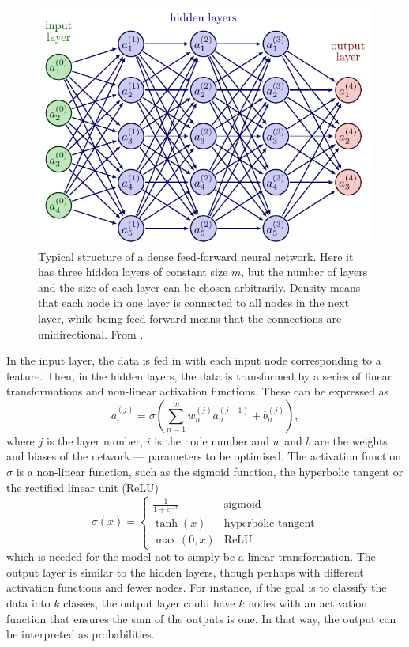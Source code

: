 \begin{figure}
    \centering
    \includegraphics[width=0.8\linewidth, page=4]{tex/02_ml/neural_networks.pdf}
    \caption{
        Typical structure of a dense feed-forward neural network.
        Here it has three hidden layers of constant size $m$, but the number of layers and the size of each layer can be chosen arbitrarily.
        Density means that each node in one layer is connected to all nodes in the next layer, while being feed-forward means that the connections are unidirectional.
        From \cite{nn_figs}.
    }
    \label{fig:nn}
\end{figure}

In the input layer, the data is fed in with each input node corresponding to a feature.
Then, in the hidden layers, the data is transformed by a series of linear transformations and non-linear activation functions.
These can be expressed as
\begin{equation}
    \label{eq:nn}
    a_i^{(j)} = \sigma\left( \sum_{n=1}^m w^{(j)}_n a^{(j-1)}_n + b^{(j)}_n \right),
\end{equation}
where $j$ is the layer number, $i$ is the node number and $w$ and $b$ are the weights and biases of the network — parameters to be optimised.
The activation function $\sigma$ is a non-linear function, such as the sigmoid function, the hyperbolic tangent or the rectified linear unit (ReLU)
\begin{equation}
    \sigma(x) = \begin{cases}
        \frac{1}{1 + e^{-x}} & \text{sigmoid}            \\
        \tanh(x)             & \text{hyperbolic tangent} \\
        \max(0, x)           & \text{ReLU}
    \end{cases}
\end{equation}
which is needed for the model not to simply be a linear transformation.
The output layer is similar to the hidden layers, though perhaps with different activation functions and fewer nodes.
For instance, if the goal is to classify the data into $k$ classes, the output layer could have $k$ nodes with an activation function that ensures the sum of the outputs is one.
In that way, the output can be interpreted as probabilities.

